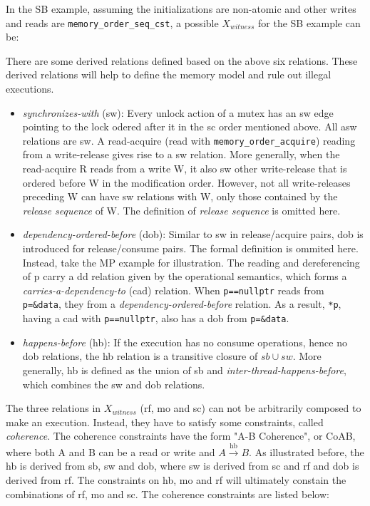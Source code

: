 In the SB example, assuming the initializations are non-atomic and other writes and reads are \texttt{memory\_order\_seq\_cst}, a possible $X_{witness}$ for the SB example can be:

There are some derived relations defined based on the above six relations. These derived relations will help to define the memory model and rule out illegal executions.

\begin{itemize}
    \item \textit{synchronizes-with} (sw): Every unlock action of a mutex has an sw edge pointing to the lock odered after it in the sc order mentioned above. All asw relations are sw. A read-acquire (read with \texttt{memory\_order\_acquire}) reading from a write-release gives rise to a sw relation. More generally, when the read-acquire R reads from a write W, it also sw other write-release that is ordered before W in the modification order. However, not all write-releases preceding W can have sw relations with W, only those contained by the \textit{release sequence} of W. The definition of \textit{release sequence} is omitted here. 
    \item \textit{dependency-ordered-before} (dob): Similar to sw in release/acquire pairs, dob is introduced for release/consume pairs. The formal definition is ommited here. Instead, take the MP example for illustration. The reading and dereferencing of p carry a dd relation given by the operational semantics, which forms a \textit{carries-a-dependency-to} (cad) relation. When \texttt{p==nullptr} reads from \texttt{p=\&data}, they from a \textit{dependency-ordered-before} relation. As a result, \texttt{*p}, having a cad with \texttt{p==nullptr}, also has a dob from \texttt{p=\&data}. 
    \item \textit{happens-before} (hb): If the execution has no consume operations, hence no dob relations, the hb relation is a transitive closure of $sb \cup sw$. More generally, hb is defined as the union of sb and \textit{inter-thread-happens-before}, which combines the sw and dob relations.
\end{itemize}


The three relations in $X_{witness}$ (rf, mo and sc) can not be arbitrarily composed to make an execution. Instead, they have to satisfy some constraints, called \textit{coherence}. The coherence constraints have the form "A-B Coherence", or CoAB, where both A and B can be a read or write and  $A \xrightarrow{\text{hb}} B$. As illustrated before, the hb is derived from sb, sw and dob, where sw is derived from sc and rf and dob is derived from rf. The constraints on hb, mo and rf will ultimately constain the combinations of rf, mo and sc. The coherence constraints are listed below:

